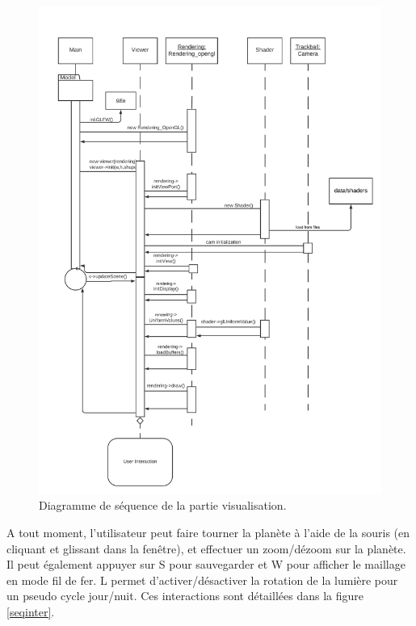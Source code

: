 \documentclass[a4paper]{article}
\begin{document}
\begin{figure}[!ht]
    \begin{center}
        \includegraphics[width=0.9\linewidth]{img/visu_seq.png} 
        \caption{Diagramme de séquence de la partie visualisation.}
        \label{seqvisu}
    \end{center}
\end{figure}


\newpage
A tout moment, l'utilisateur peut faire tourner la planète à l'aide de la souris (en cliquant et glissant dans la fenêtre), et effectuer un zoom/dézoom sur la planète. Il peut également appuyer sur S pour sauvegarder et W pour afficher le maillage en mode fil de fer. L permet d'activer/désactiver la rotation de la lumière pour un pseudo cycle jour/nuit. Ces interactions sont détaillées dans la figure \ref{seqinter}.
\end{document}
